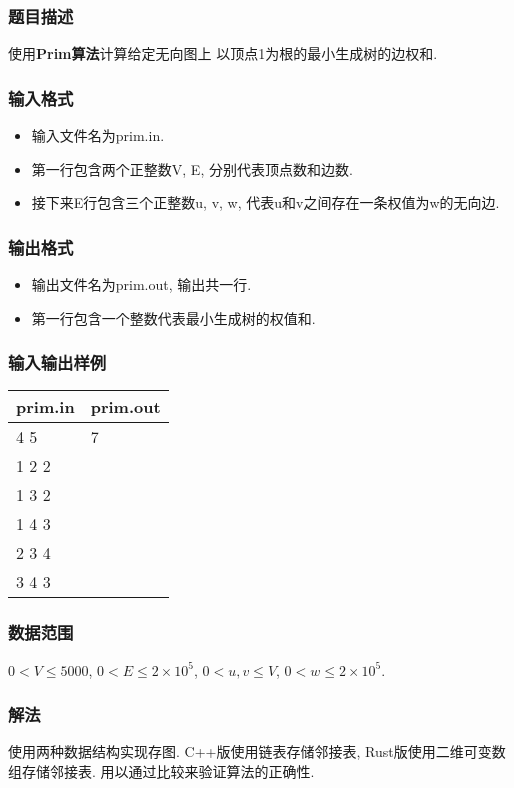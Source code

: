 \subsubsection{题目描述}
使用\textbf{Prim算法}计算给定无向图上  以顶点1为根的最小生成树的边权和.

\subsubsection{输入格式}
\begin{itemize}
	\item 输入文件名为prim.in.
	\item 第一行包含两个正整数V, E, 分别代表顶点数和边数.
	\item 接下来E行包含三个正整数u, v, w, 代表u和v之间存在一条权值为w的无向边.
\end{itemize}

\subsubsection{输出格式}
\begin{itemize}
	\item 输出文件名为prim.out, 输出共一行.
	\item 第一行包含一个整数代表最小生成树的权值和.
\end{itemize}

\subsubsection{输入输出样例}
\begin{table}[h!]
	\centering
	\begin{tabular}{|l|l|}
		\hline
		prim.in & prim.out \\
		\hline
		4 5     & 7        \\
		1 2 2   & ~        \\
		1 3 2   & ~        \\
		1 4 3   & ~        \\
		2 3 4   & ~        \\
		3 4 3   & ~        \\
		\hline
	\end{tabular}
\end{table}

\subsubsection{数据范围}
$0 < V \leq 5000$,
$0 < E \leq 2\times 10^5$,
$0 < u,v \leq V$,
$0 < w \leq 2\times 10^5$.

\subsubsection{解法}
使用两种数据结构实现存图. C++版使用链表存储邻接表,
Rust版使用二维可变数组存储邻接表. 用以通过比较来验证算法的正确性.

